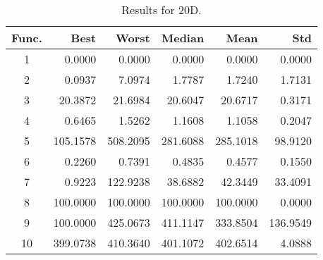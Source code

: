 \begin{table}[ht]
\centering
\caption{ Results for 20D. }
\label{tab:20D}
\begin{tabular}{crrrrr}
\hline
{Func.} & Best & Worst & Median & Mean & Std \\
\hline
1 & 0.0000 & 0.0000 & 0.0000 & 0.0000 & 0.0000 \\
2 & 0.0937 & 7.0974 & 1.7787 & 1.7240 & 1.7131 \\
3 & 20.3872 & 21.6984 & 20.6047 & 20.6717 & 0.3171 \\
4 & 0.6465 & 1.5262 & 1.1608 & 1.1058 & 0.2047 \\
5 & 105.1578 & 508.2095 & 281.6088 & 285.1018 & 98.9120 \\
6 & 0.2260 & 0.7391 & 0.4835 & 0.4577 & 0.1550 \\
7 & 0.9223 & 122.9238 & 38.6882 & 42.3449 & 33.4091 \\
8 & 100.0000 & 100.0000 & 100.0000 & 100.0000 & 0.0000 \\
9 & 100.0000 & 425.0673 & 411.1147 & 333.8504 & 136.9549 \\
10 & 399.0738 & 410.3640 & 401.1072 & 402.6514 & 4.0888 \\
\hline
\end{tabular}
\end{table}
